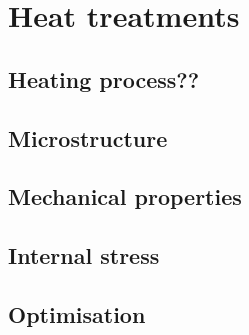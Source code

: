 \section{Heat treatments}

\subsection{Heating process??}

\subsection{Microstructure}

\subsection{Mechanical properties}

\subsection{Internal stress}

\subsection{Optimisation}



